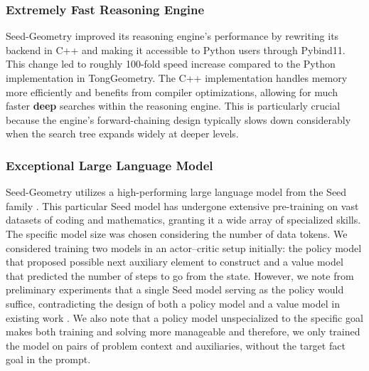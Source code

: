 \subsubsection{Extremely Fast Reasoning Engine}
Seed-Geometry improved its reasoning engine's performance by rewriting its backend in C++ and making it accessible to Python users through Pybind11. This change led to roughly 100-fold speed increase compared to the Python implementation in TongGeometry. The C++ implementation handles memory more efficiently and benefits from compiler optimizations, allowing for much faster \textbf{deep} searches within the reasoning engine. This is particularly crucial because the engine's forward-chaining design typically slows down considerably when the search tree expands widely at deeper levels.

\subsubsection{Exceptional Large Language Model}
Seed-Geometry utilizes a high-performing large language model from the Seed family \cite{seed2025seed1}. This particular Seed model has undergone extensive pre-training on vast datasets of coding and mathematics, granting it a wide array of specialized skills. The specific model size was chosen considering the number of data tokens. We considered training two models in an actor--critic setup initially: the policy model that proposed possible next auxiliary element to construct and a value model that predicted the number of steps to go from the state. However, we note from preliminary experiments that a single Seed model serving as the policy would suffice, contradicting the design of both a policy model and a value model in existing work \cite{zhang2024proposing}. We also note that a policy model unspecialized to the specific goal makes both training and solving more manageable and therefore, we only trained the model on pairs of problem context and auxiliaries, without the target fact goal in the prompt.

